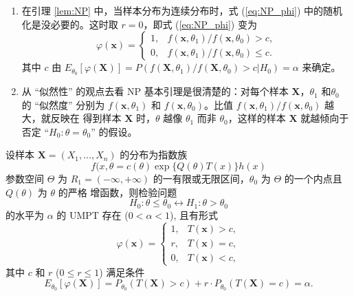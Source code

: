 \begin{remark}
    \begin{enumerate}
        \item 在引理 \ref{lem:NP} 中，当样本分布为连续分布时，式 (\ref{eq:NP_phi}) 中的随机化是没必要的。这时取 $r=0$，即式 (\ref{eq:NP_phi}) 变为
        $$\varphi(\mathbf{x}) = 
            \begin{cases}
            1, & f(\mathbf{x}, \theta_1)/f(\mathbf{x}, \theta_0) > c, \\
            0, & f(\mathbf{x}, \theta_1)/f(\mathbf{x}, \theta_0) \le c.
            \end{cases}$$
        其中 $c$ 由 $E_{\theta_0}[\varphi(\mathbf{X})] = P(f(\mathbf{X}, \theta_1)/f(\mathbf{X}, \theta_0) > c | H_0) = \alpha$ 来确定。
        \item 从 “似然性” 的观点去看 NP 基本引理是很清楚的：对每个样本 $\mathbf{X}$，$\theta_1$ 和$\theta_0$ 的 “似然度” 分别为 $f(\mathbf{x}, \theta_1)$ 和 $f(\mathbf{x}, \theta_0)$。比值 $f(\mathbf{x}, \theta_1)/f(\mathbf{x}, \theta_0)$ 越大，就反映在
        得到样本 $\mathbf{X}$ 时，$\theta$ 越像 $\theta_1$ 而非 $\theta_0$，这样的样本 $\mathbf{X}$ 就越倾向于否定 “$H_0: \theta = \theta_0$”
        的假设。
    \end{enumerate}
\end{remark}

\begin{theorem}[单边检验问题的NP定理]\label{thm:5.4.2}
    设样本 $\mathbf{X} = (X_1, \dots, X_n)$ 的分布为指数族
    \begin{equation}
        f(x,\theta = c(\theta)\exp\{Q(\theta)T(x)\}h
        (x)
    \end{equation}
    参数空间 $\Theta$
为 $R_1=(-\infty, +\infty)$ 的一有限或无限区间，$\theta_0$ 为 $\Theta$ 的一个内点且 $Q(\theta)$ 为 $\theta$ 的严格
增函数，则检验问题
\begin{equation}
    H_0: \theta\le\theta_0 \leftrightarrow H_1: \theta>\theta_0
\end{equation}的水平为 $\alpha$ 的 UMPT 存在 ($0 < \alpha < 1$), 且有形式
\begin{equation}
\varphi(\mathbf{x}) = \begin{cases}
1, & T(\mathbf{x}) > c, \\
r, & T(\mathbf{x}) = c, \\
0, & T(\mathbf{x}) < c,
\end{cases} \label{eq:UMP_form}
\end{equation}
其中 $c$ 和 $r$ ($0 \le r \le 1$) 满足条件
\begin{equation}
E_{\theta_0}[\varphi(\mathbf{X})] = P_{\theta_0}(T(\mathbf{X}) > c) + r \cdot P_{\theta_0}(T(\mathbf{X}) = c) = \alpha. \label{eq:UMP_alpha_condition}
\end{equation}
\end{theorem}

